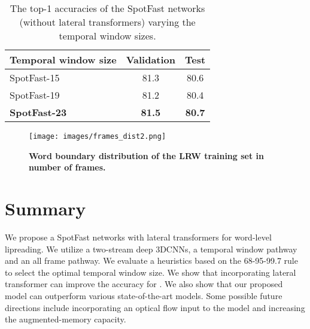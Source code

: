\documentclass{article}
\begin{document}
\begin{table}[] \label{stable2}
\vspace{0.5\baselineskip}
\centering
\caption{The top-1 accuracies of the SpotFast networks (without lateral transformers) varying the temporal window sizes.}
\vspace{0.5\baselineskip}
\label{stable2}
\begin{tabular}{l|c|c}
\hline
 Temporal window size    & Validation & Test  \\
\hline
 SpotFast-15 & 81.3 & 80.6\\
\hline
SpotFast-19 & 81.2  & 80.4 \\ 
\hline
\textbf{SpotFast-23} &  \textbf{81.5} & \textbf{80.7}\\
\hline
\end{tabular}
\end{table}

\begin{figure}[t] \label{figstat}
\begin{center}
   \texttt{[image: images/frames\_dist2.png]}
\end{center}
\vspace{-1.5\baselineskip}
   \caption{\textbf{Word boundary distribution of the LRW training set in number of frames.}}
\label{fig:long}
\label{fig:onecol}
\vspace{-1\baselineskip}
\end{figure}







 \section{Summary}
We propose a SpotFast networks with lateral transformers for word-level lipreading. We utilize a two-stream deep 3DCNNs, a temporal window pathway and an all frame pathway. We evaluate a heuristics based on the 68-95-99.7 rule to select the optimal temporal window size. We show that incorporating lateral transformer can improve the accuracy for . We also show that our proposed model can outperform various state-of-the-art models. Some possible future directions include incorporating an optical flow input to the model and increasing the augmented-memory capacity.
 


\end{document}
